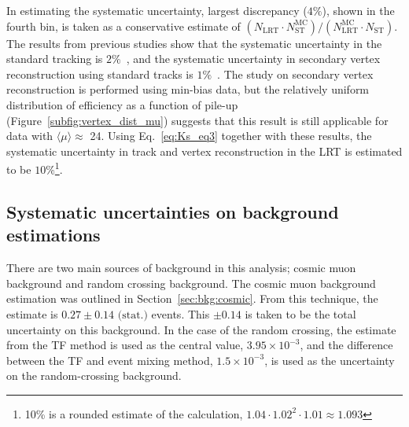 In estimating the systematic uncertainty, largest discrepancy ($4\%$), shown in the fourth bin, is taken as a conservative estimate of $(N_{\mathrm{LRT}} \cdot N_{\mathrm{ST}}^{\mathrm{MC}}) / (N_{\mathrm{LRT}}^{\mathrm{MC}} \cdot N_{\mathrm{ST}})$. The results from previous studies show that the systematic uncertainty in the standard tracking is $2\%$~\cite{ATL-PHYS-PUB-2015-051}, and the systematic uncertainty in secondary vertex reconstruction using standard tracks is $1\%$~\cite{Aaboud:2215485}. The study on secondary vertex reconstruction is performed using min-bias data, but the relatively uniform distribution of efficiency as a function of pile-up (Figure~\ref{subfig:vertex_dist_mu}) suggests that this result is still applicable for data with $\langle \mu \rangle\approx$ 24. Using Eq.~\ref{eq:Ks_eq3} together with these results, the systematic uncertainty in track and vertex reconstruction in the LRT is estimated to be $10\%$\footnote{10\% is a rounded estimate of the calculation, $1.04\cdot1.02^{2}\cdot1.01\approx1.093$}.


%
%
%

\subsection{Systematic uncertainties on background estimations}
\label{sec:syst_bkg}

There are two main sources of background in this analysis; cosmic muon background and random crossing background. The cosmic muon background estimation was outlined in Section~\ref{sec:bkg:cosmic}. From this technique, the estimate is $0.27 \pm 0.14 \textrm{ (stat.)}$ events. This $\pm 0.14$ is taken to be the total uncertainty on this background. In the case of the random crossing, the estimate from the TF method is used as the central value, $3.95 \times 10^{-3}$, and the difference between the TF and event mixing method, $1.5\times10^{-3}$, is used as the uncertainty on the random-crossing background.












